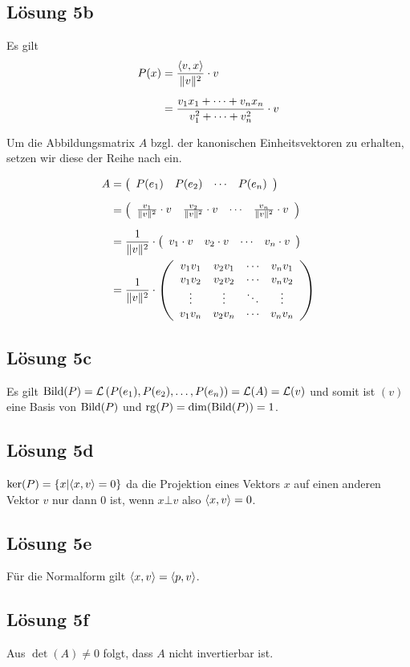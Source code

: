 \documentclass[main.tex]{subfiles}
\begin{document}
\subsection{Lösung 5b}
Es gilt
\begin{align*}
    P(x)
    &= \frac{\scalarprod{v,x}}{\norm{v}^2} \cdot v \\[2mm]
    &= \frac{v_1 x_1 + \dots + v_n x_n}{v_1^2 + \dots + v_n^2} \cdot v
\end{align*}

Um die Abbildungsmatrix $A$ bzgl. der kanonischen Einheitsvektoren zu erhalten, setzen wir diese der Reihe nach ein.

\begin{align*}
    A &= \eqmatrix{cccc}{
        P(e_1) & P(e_2) & \cdots & P(e_n)
    } \\[2mm]
    &=
    \eqmatrix{cccc}{
        \frac{v_1}{\norm{v}^2} \cdot v & \frac{v_2}{\norm{v}^2} \cdot v & \cdots & \frac{v_n}{\norm{v}^2} \cdot v
    } \\[2mm]
    &=
    \frac{1}{\norm{v}^2} \cdot
    \eqmatrix{cccc}{
        v_1 \cdot v & v_2 \cdot v & \cdots & v_n \cdot v
    } \\
    &=
    \frac{1}{\norm{v}^2} \cdot
    \eqmatrix{cccc}{
        v_1 v_1 & v_2 v_1 & \cdots & v_n v_1 \\
        v_1 v_2 & v_2 v_2 & \cdots & v_n v_2 \\
               \vdots &        \vdots & \ddots & \vdots \\
        v_1 v_n & v_2 v_n & \cdots & v_n v_n \\
    }
\end{align*}

\subsection{Lösung 5c}

Es gilt $\Bild (P) = \mathcal{L}\left( P(e_1), P(e_2), \dots, P(e_n) \right) = \mathcal{L} (A) = \mathcal{L} (v)$ und somit ist $(v)$ eine Basis von $\Bild (P)$ und $\rg (P) = \dim(\Bild(P)) = 1$.

\subsection{Lösung 5d}
$\ker (P) = \left\{x \middle| \scalarprod{x, v} = 0\right\}$ da die Projektion eines Vektors $x$ auf einen anderen Vektor $v$ nur dann $0$ ist, wenn $x\bot v$ also $\scalarprod{x,v} = 0$.

\subsection{Lösung 5e}
Für die Normalform gilt $\scalarprod{x,v}=\scalarprod{p,v}$.

\subsection{Lösung 5f}
Aus $\det(A) \neq 0$  folgt, dass $A$ nicht invertierbar ist.
\end{document}
